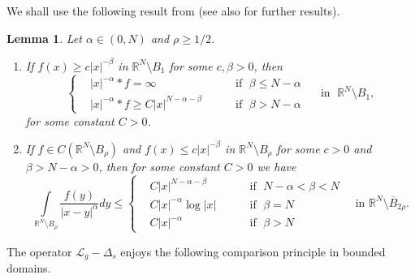 \documentclass[10pt,a4paper]{amsart}
\numberwithin{equation}{section}
\newcommand{\R}{\mathbb R}
\newcommand{\Lg}{{\mathcal L}_g}
\newtheorem{lemma}[theorem]{Lemma}
\begin{document}
We shall use the following result from \cite[Lemma 3.7]{GKS20} (see also \cite{Gbook22, GT16book} for further results).
\begin{lemma}\label{lbas}
Let $\alpha\in (0,N)$ and $\rho\geq  1/2$.

\begin{enumerate}
\item[\rm (i)]
If $f(x)\geq c|x|^{-\beta}$ in $\R^N\setminus B_{1}$ for some $c,\beta>0$, then
$$ \left\{
\begin{aligned}
&  |x|^{-\alpha}*f=\infty && \quad\mbox{ if } \; \beta \leq N-\alpha \\
&  |x|^{-\alpha}*f\geq C|x|^{N-\alpha-\beta} && \quad\mbox{ if } \; \beta> N-\alpha
\end{aligned}
\right. \quad\mbox{ in }\; \R^N\setminus B_{1},
$$
for some constant $C>0$.

\item[\rm (ii)]
If $f\in C(\R^N\setminus B_\rho)$ and $\displaystyle f(x)\leq  c|x|^{-\beta}$ in $\R^N\setminus B_{\rho}$ for some $c>0$ and $\beta>N-\alpha>0$, then for some constant $C>0$ we have
$$ 
\int\limits_{\R^N\setminus B_{\rho}}\frac{f(y)}{|x-y|^{\alpha}} dy \leq 
\left\{
\begin{aligned}
&C |x|^{N-\alpha-\beta} &&\quad\mbox{ if }\; N-\alpha<\beta<N\\
&C|x|^{-\alpha}\log|x|   &&\quad\mbox{ if }\; \beta=N\\
&C|x|^{-\alpha} &&\quad\mbox{ if }\; \beta>N
\end{aligned}
\right.
\quad\mbox{in }\R^N\setminus \overline B_{2\rho}.
$$
\end{enumerate}
\end{lemma}

The operator $\Lg-\Delta_s$ enjoys the following comparison principle in bounded domains.
\end{document}
